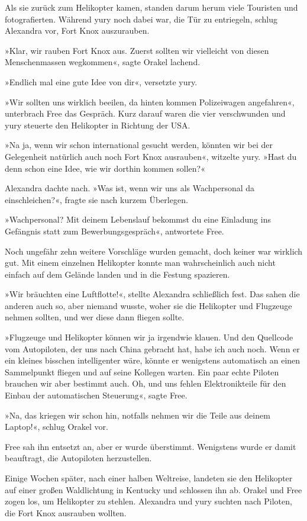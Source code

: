 Als sie zurück zum Helikopter kamen, standen darum herum viele Touristen und fotografierten. Während yury noch dabei war, die Tür zu entriegeln, schlug Alexandra vor, Fort Knox auszurauben.

»Klar, wir rauben Fort Knox aus. Zuerst sollten wir vielleicht von diesen Menschenmassen wegkommen«, sagte Orakel lachend.

»Endlich mal eine gute Idee von dir«, versetzte yury.

»Wir sollten uns wirklich beeilen, da hinten kommen Polizeiwagen angefahren«, unterbrach Free das Gespräch. Kurz darauf waren die vier verschwunden und yury steuerte den Helikopter in Richtung der USA.

»Na ja, wenn wir schon international gesucht werden, könnten wir bei der Gelegenheit natürlich auch noch Fort Knox ausrauben«, witzelte yury. »Hast du denn schon eine Idee, wie wir dorthin kommen sollen?«

Alexandra dachte nach. »Was ist, wenn wir uns als Wachpersonal da einschleichen?«, fragte sie nach kurzem Überlegen.

»Wachpersonal? Mit deinem Lebenslauf bekommst du eine Einladung ins Gefängnis statt zum Bewerbungsgespräch«, antwortete Free.

Noch ungefähr zehn weitere Vorschläge wurden gemacht, doch keiner war wirklich gut. Mit einem einzelnen Helikopter konnte man wahrscheinlich auch nicht einfach auf dem Gelände landen und in die Festung spazieren.

»Wir bräuchten eine Luftflotte!«, stellte Alexandra schließlich fest. Das sahen die anderen auch so, aber niemand wusste, woher sie die Helikopter und Flugzeuge nehmen sollten, und wer diese dann fliegen sollte.

»Flugzeuge und Helikopter können wir ja irgendwie klauen. Und den Quellcode vom Autopiloten, der uns nach China gebracht hat, habe ich auch noch. Wenn er ein kleines bisschen intelligenter wäre, könnte er wenigstens automatisch an einen Sammelpunkt fliegen und auf seine Kollegen warten. Ein paar echte Piloten brauchen wir aber bestimmt auch. Oh, und uns fehlen Elektronikteile für den Einbau der automatischen Steuerung«, sagte Free.

»Na, das kriegen wir schon hin, notfalls nehmen wir die Teile aus deinem Laptop!«, schlug Orakel vor.

Free sah ihn entsetzt an, aber er wurde überstimmt. Wenigstens wurde er damit beauftragt, die Autopiloten herzustellen.

Einige Wochen später, nach einer halben Weltreise, landeten sie den Helikopter auf einer großen Waldlichtung in Kentucky und schlossen ihn ab. Orakel und Free zogen los, um Helikopter zu stehlen. Alexandra und yury suchten nach Piloten, die Fort Knox ausrauben wollten.


